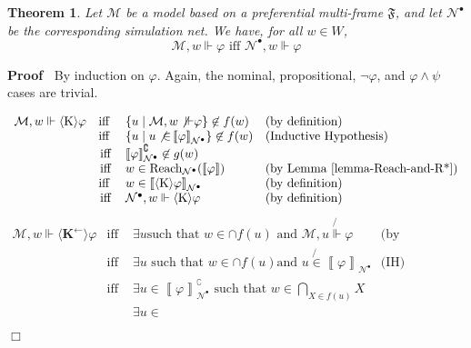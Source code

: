 \documentclass{article}
\newcommand{\infixiff}{\text{ iff }}
\newcommand{\nin}{\not\in}
\newcommand{\tmmathbf}[1]{\ensuremath{\boldsymbol{#1}}}
\newcommand{\tmop}[1]{\ensuremath{\operatorname{#1}}}
\newcommand{\tmtextbf}[1]{\text{{\bfseries{#1}}}}
\newenvironment{proof}{\noindent\textbf{Proof\ }}{\hspace*{\fill}$\Box$\medskip}
\newtheorem{theorem}{Theorem}
\providecommand{\infixiff}{\mathbin{\text{ iff }}}
\newcommand{\Model}{\ensuremath{\mathcal{M}}}
\newcommand{\Net}{\ensuremath{\mathcal{N}}}
\newcommand{\semantics}[1]{\left\llbracket #1 \right\rrbracket}
\newcommand{\diaKnow}{\langle \tmmathbf{\text{K}} \rangle}
\newcommand{\diaKnownby}{\langle \tmmathbf{\text{K}^{\leftarrow}} \rangle}
\newcommand{\Reach}{\textsf{\tmop{Reach}}}
\begin{document}
\begin{theorem}
  \label{frame-to-net}Let $\Model$ be a model based on a preferential
  multi-frame $\mathfrak{F}$, and let $\Net^{\bullet}$ be the corresponding
  simulation net. We have, for all $w \in W$,
  \[ \Model, w \Vdash \varphi \infixiff \Net^{\bullet}, w \Vdash \varphi \]
\end{theorem}

\begin{proof}
  By induction on $\varphi$. Again, the nominal, propositional, $\neg
  \varphi$, and $\varphi \wedge \psi$ cases are trivial.
  \begin{description}
    \tmtextbf{}\tmtextbf{$\diaKnow \varphi$ case:}
    \[ \begin{array}{lcll}
         \Model, w \Vdash \diaKnow \varphi & \text{iff } & \left\{ u \mid
         \Model, w \not{\Vdash} \varphi \right\} \nin f (w) & \text{(by
         definition)}\\
         & \text{iff } & \left\{ u \mid u \not{\in}
         \semantics{\varphi}_{\Net^{\bullet}} \right\}  \nin f (w) &
         \text{(Inductive Hypothesis)}\\
         & \tmop{iff} & \semantics{\varphi}_{\Net^{\bullet}}^{\complement}
         \nin g (w) & \\
         & \tmop{iff} & w \in \Reach_{\Net^{\bullet}} (\semantics{\varphi}) &
         \text{(by Lemma \ref{lemma-Reach-and-R*})}\\
         & \text{iff } & w \in \semantics{\diaKnow \varphi}_{\Net^{\bullet}}
         & \text{(by definition)}\\
         & \tmop{iff} & \Net^{\bullet}, w \Vdash \diaKnow \varphi & \text{(by
         definition)}
       \end{array} \]
    \tmtextbf{$\diaKnownby \varphi$ case:}
    \[ \begin{array}{lcll}
         \Model, w \Vdash \diaKnownby \varphi & \text{iff } & \exists u \text{
         such that } w \in \cap f (u) \text{ and } \Model, u \not{\Vdash}
         \varphi & \text{(by definition)}\\
         & \tmop{iff} & \exists u \text{ such that } w \in \cap f (u) \text{
         and } u \not{\in} \semantics{\varphi}_{\Net^{\bullet}} &
         \text{(IH)}\\
         & \tmop{iff} & \exists u \in
         \semantics{\varphi}_{\Net^{\bullet}}^{\complement} \text{ such that }
         w \in \bigcap_{X \in f (u)} X & \\
         &  & \exists u \in

\end{array}\]
\end{description}
\end{proof}
\end{document}

